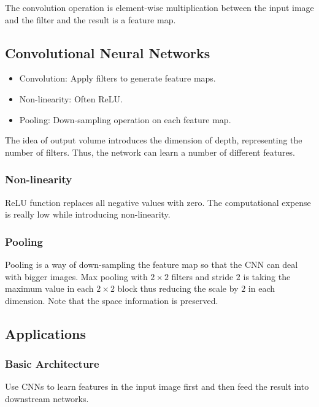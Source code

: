 \documentclass[12pt, a4paper, oneside]{article}
\begin{document}
The convolution operation is element-wise multiplication between the input image and the filter and the result is a feature map.

\subsection{Convolutional Neural Networks}

\begin{itemize}
    \item Convolution: Apply filters to generate feature maps.
    \item Non-linearity: Often ReLU.
    \item Pooling: Down-sampling operation on each feature map.
\end{itemize}

The idea of output volume introduces the dimension of depth, representing the number of filters. Thus, the network can learn a number of different features.

\subsubsection{Non-linearity}

ReLU function replaces all negative values with zero. The computational expense is really low while introducing non-linearity.

\subsubsection{Pooling}

Pooling is a way of down-sampling the feature map so that the CNN can deal with bigger images. Max pooling with $2\times 2$ filters and stride $2$ is taking the maximum value in each $2\times 2$ block thus reducing the scale by $2$ in each dimension. Note that the space information is preserved.

\subsection{Applications}

\subsubsection{Basic Architecture}

Use CNNs to learn features in the input image first and then feed the result into downstream networks.
\end{document}
